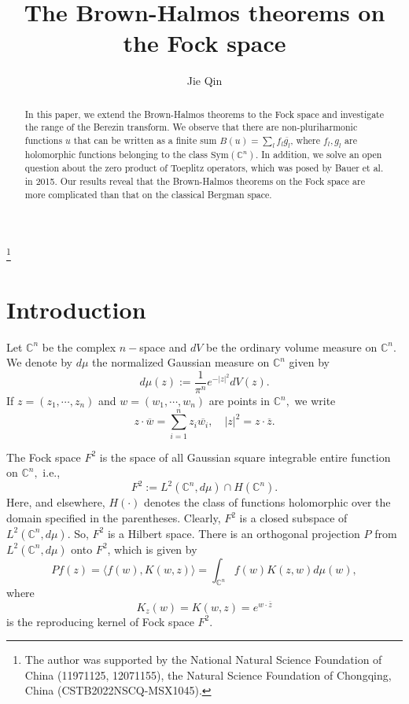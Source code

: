 \documentclass[11pt,reqno]{amsart}
\theoremstyle{definition}
\begin{document}
\title{The Brown-Halmos theorems on the Fock space}

\author{Jie Qin}
\address{School of Mathematics and Statistics, Chongqing Technology and Business University, 400067, China}

\thanks{The author was supported by the National Natural
Science Foundation of China (11971125, 12071155), the Natural Science Foundation of Chongqing, China (CSTB2022NSCQ-MSX1045).}

\begin{abstract}
In this paper, we extend the Brown-Halmos theorems to the Fock space and investigate the range of the Berezin transform. We observe that there are non-pluriharmonic  functions $u$ that can be written as a finite sum $B(u)=\sum_lf_l\overline{g_l}$, where $f_l,g_l$ are holomorphic functions  belonging to the class $\mathrm{Sym}(\mathbb{C}^n)$. In addition, we solve an open question about the zero product of Toeplitz operators, which was posed by Bauer et al. in 2015. Our results reveal that the Brown-Halmos theorems on the Fock space are more complicated than that on the classical Bergman space.
\end{abstract}


\maketitle

\section{Introduction}\label{s1}

Let $\mathbb{C}^n$ be the complex $n-$space and  $dV$ be the ordinary volume measure on $\mathbb{C}^n$. We denote by $d\mu$ the normalized Gaussian measure on $\mathbb{C}^n$ given by
$$d\mu(z):=\frac{1}{\pi^n}e^{-|z|^2}dV(z).$$
If $z=(z_1,\cdots,z_n)$ and $w=(w_1,\cdots,w_n)$ are points in $\mathbb{C}^n,$ we write
$$z\cdot\overline{w}=\sum_{i=1}^nz_i\overline{w_i},\quad |z|^2=z\cdot\overline{z}.$$

The Fock space $F^2$ is the space of all Gaussian square integrable entire function on $\mathbb{C}^n,$ i.e.,
$$F^2:=L^{2}(\mathbb{C}^n,d\mu)\cap H(\mathbb{C}^n).$$
Here, and elsewhere, $H(\cdot)$ denotes the class of functions holomorphic over the domain specified in the parentheses.
Clearly, $F^2$ is a closed subspace of $L^{2}(\mathbb{C}^n,d\mu)$. So, $F^2$ is a Hilbert space. There is an orthogonal projection $P$ from $L^{2}(\mathbb{C}^n,d\mu)$ onto $F^{2}$, which is given by
$$Pf(z)=\langle f(w), K(w,z)\rangle=\int_{\mathbb{C}^n} f(w) K(z,w)d\mu(w),$$
where $$K_z(w)=K(w,z)=e^{w\cdot\overline{z}}$$ is the reproducing kernel of Fock space $F^{2}.$
\end{document}
